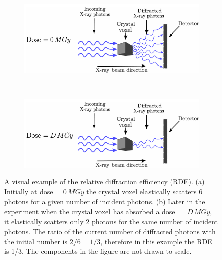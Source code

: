 \begin{figure}
        \centering
        \begin{subfigure}[b]{1\textwidth}
                \centering
                \includegraphics[width=\textwidth]{figures/dwd/rde1.pdf}
                \caption{}
                \label{fig:Graphical depiction of RDE - 0 MGy}
        \end{subfigure}
				\\
        \begin{subfigure}[b]{1\textwidth}
                \centering
                \includegraphics[width=\textwidth]{figures/dwd/rde2.pdf}
                \caption{}
                \label{fig:Graphical depiction of RDE - D MGy}
        \end{subfigure}
        \caption[Relative diffraction efficiency (RDE) schematic]{A visual example of the relative diffraction efficiency (RDE).
        (a) Initially at dose = $0\, MGy$ the crystal voxel elastically scatters 6 photons for a given number of incident photons.
        (b) Later in the experiment when the crystal voxel has absorbed a dose $= D\, MGy$, it elastically scatters only 2 photons for the same number of incident photons.
        The ratio of the current number of diffracted photons with the initial number is $2/6 = 1/3$, therefore in this example the RDE is 1/3.
        The components in the figure are not drawn to scale.}
        \label{fig: Graphical depiction of RDE}
\end{figure}

